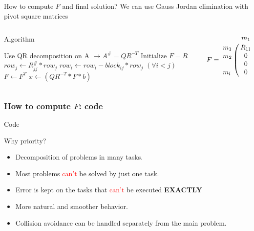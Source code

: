 \documentclass[11pt]{beamer}
\begin{document}
\begin{frame}{How to compute $F$ and final solution?}
We can use Gauss Jordan elimination with pivot square matrices
\begin{columns}
\begin{column}{.5\textwidth}
\begin{block}{Algorithm}
\begin{algorithmic}[1]
\State Use QR decomposition on A $\rightarrow A^{\#} = QR^{-T}$ 
\State Initialize $F = R$
\State $row_j \gets R_{jj}^{\#}*row_j$
\State $row_i \gets row_i - block_{ij}*row_j$ $(\forall i < j)$
\EndFor
\State $F \gets F^T$
\State $x \gets (QR^{-T}*F*b)$
\end{algorithmic}
\end{block}
\end{column}
\begin{column}{.5\textwidth}
\[
F = \bordermatrix{
~& m_1 & m_2 & & m_l\cr
m_1 & R_{11} & \star & \dots & \star \cr
m_2 & 0 & R_{22} & \dots & \star \cr
~ & 0 & 0 & \dots & \star \cr
m_l & 0 & 0 & \dots & R_{ll}
}
\]
\end{column}
\end{columns}
\end{frame}

\begin{frame}[fragile]
\frametitle{How to compute $F$: code}
\begin{block}{Code}
\begin{adjustbox}{width=\textwidth , height=.2\textwidth}

\end{adjustbox}
\end{block}
\end{frame}

\begin{frame}{Why priority?}
\begin{itemize}
\item Decomposition of problems in many tasks.
\item Most problems \textcolor{red}{can't} be solved by just one task.
\item Error is kept on the tasks that \textcolor{red}{can't} be executed	\textbf{EXACTLY} 
\item More natural and smoother behavior.
\item Collision avoidance can be handled separately from the main problem.
\end{itemize}
\end{frame}
\end{document}

